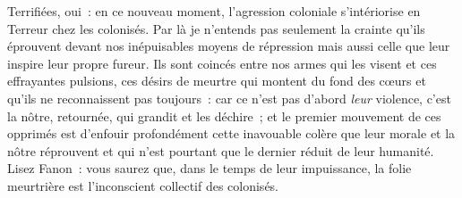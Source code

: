 \documentclass[french,twoside]{book} %
\begin{document}
Terrifiées, oui : en ce nouveau moment, l’agression coloniale s’intériorise en Terreur chez les colonisés. Par là je n’entends pas seulement la crainte qu’ils éprouvent devant nos inépuisables moyens de répression mais aussi celle que leur inspire leur propre fureur. Ils sont coincés entre nos armes qui les visent et ces effrayantes pulsions, ces désirs de meurtre qui montent du fond des cœurs et qu’ils ne reconnaissent pas toujours : car ce n’est pas d’abord \emph{leur} violence, c’est la nôtre, retournée, qui grandit et les déchire ; et le premier mouvement de ces opprimés est d’enfouir profondément cette inavouable colère que leur morale et la nôtre réprouvent et qui n’est pourtant que le dernier réduit de leur humanité. Lisez Fanon : vous saurez que, dans le temps de leur impuissance, la folie meurtrière est l’inconscient collectif des colonisés.\par
\end{document}
